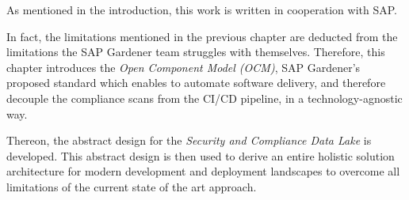 As mentioned in the introduction, this work is written in cooperation with SAP.\par
In fact, the limitations mentioned in the previous chapter are deducted from the limitations the SAP Gardener team struggles with themselves. Therefore, this chapter introduces the \textit{Open Component Model (OCM)}, SAP Gardener's proposed standard which enables to automate software delivery, and therefore decouple the compliance scans from the CI/CD pipeline, in a technology-agnostic way.\par
Thereon, the abstract design for the \emph{Security and Compliance Data Lake} is developed. This abstract design is then used to derive an entire holistic solution architecture for modern development and deployment landscapes to overcome all limitations of the current state of the art approach.

